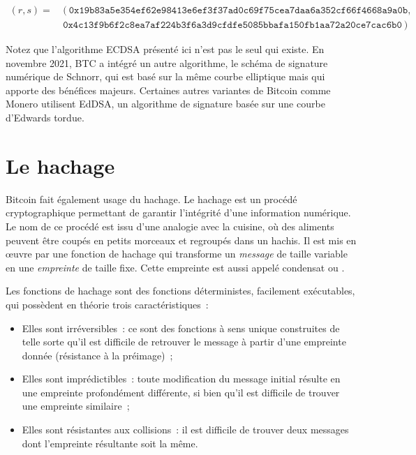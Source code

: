 { \scriptsize
\begin{align*}
(r, s) = &~(~\mathtt{0x19b83a5e354ef62e98413e6ef3f37ad0c69f75cea7daa6a352cf66f4668a9a0b}, \\
    &~\mathtt{0x4c13f9b6f2c8ea7af224b3f6a3d9cfdfe5085bbafa150fb1aa72a20ce7cac6b0}~)
\end{align*}
}

Notez que l'algorithme ECDSA présenté ici n'est pas le seul qui existe. En novembre 2021, BTC a intégré un autre algorithme, le schéma de signature numérique de Schnorr, qui est basé sur la même courbe elliptique mais qui apporte des bénéfices majeurs. Certaines autres variantes de Bitcoin comme Monero utilisent EdDSA, un algorithme de signature basée sur une courbe d'Edwards tordue.

\section*{Le hachage} %

Bitcoin fait également usage du hachage. Le hachage est un procédé cryptographique permettant de garantir l'intégrité d'une information numérique. Le nom de ce procédé est issu d'une analogie avec la cuisine, où des aliments peuvent être coupés en petits morceaux et regroupés dans un hachis. Il est mis en œuvre par une fonction de hachage qui transforme un \emph{message} de taille variable en une \emph{empreinte} de taille fixe. Cette empreinte est aussi appelé condensat ou .

Les fonctions de hachage sont des fonctions déterministes, facilement exécutables, qui possèdent en théorie trois caractéristiques~:

\begin{itemize}
  \item Elles sont irréversibles~: ce sont des fonctions à sens unique construites de telle sorte qu'il est difficile de retrouver le message à partir d'une empreinte donnée (résistance à la préimage)~;
  \item Elles sont imprédictibles~: toute modification du message initial résulte en une empreinte profondément différente, si bien qu'il est difficile de trouver une empreinte similaire~;
  \item Elles sont résistantes aux collisions~: il est difficile de trouver deux messages dont l'empreinte résultante soit la même.
\end{itemize}

